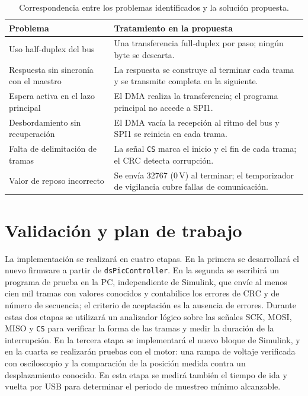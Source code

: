 \documentclass[11pt]{article}
\newcommand{\code}[1]{\texttt{#1}}
\begin{document}
\begin{table}[tbp]
\centering
\small
\begin{tabularx}{\linewidth}{@{}p{4.2cm}X@{}}
\toprule
Problema & Tratamiento en la propuesta \\ \midrule
Uso half-duplex del bus & Una transferencia full-duplex por paso; ningún byte se descarta. \\
Respuesta sin sincronía con el maestro & La respuesta se construye al terminar cada trama y se transmite completa en la siguiente. \\
Espera activa en el lazo principal & El DMA realiza la transferencia; el programa principal no accede a SPI1. \\
Desbordamiento sin recuperación & El DMA vacía la recepción al ritmo del bus y SPI1 se reinicia en cada trama. \\
Falta de delimitación de tramas & La señal \code{CS} marca el inicio y el fin de cada trama; el CRC detecta corrupción. \\
Valor de reposo incorrecto & Se envía 32767 (0\,V) al terminar; el temporizador de vigilancia cubre fallas de comunicación. \\
\bottomrule
\end{tabularx}
\caption{Correspondencia entre los problemas identificados y la solución propuesta.}
\end{table}

\section{Validación y plan de trabajo}

La implementación se realizará en cuatro etapas. En la primera se desarrollará
el nuevo firmware a partir de \code{dsPicController}. En la segunda se
escribirá un programa de prueba en la PC, independiente de Simulink, que envíe
al menos cien mil tramas con valores conocidos y contabilice los errores de CRC
y de número de secuencia; el criterio de aceptación es la ausencia de errores.
Durante estas dos etapas se utilizará un analizador lógico sobre las señales
SCK, MOSI, MISO y \code{CS} para verificar la forma de las tramas y medir la
duración de la interrupción. En la tercera etapa se implementará el nuevo
bloque de Simulink, y en la cuarta se realizarán pruebas con el motor: una
rampa de voltaje verificada con osciloscopio y la comparación de la posición
medida contra un desplazamiento conocido. En esta etapa se medirá también el
tiempo de ida y vuelta por USB para determinar el periodo de muestreo mínimo
alcanzable.
\end{document}
